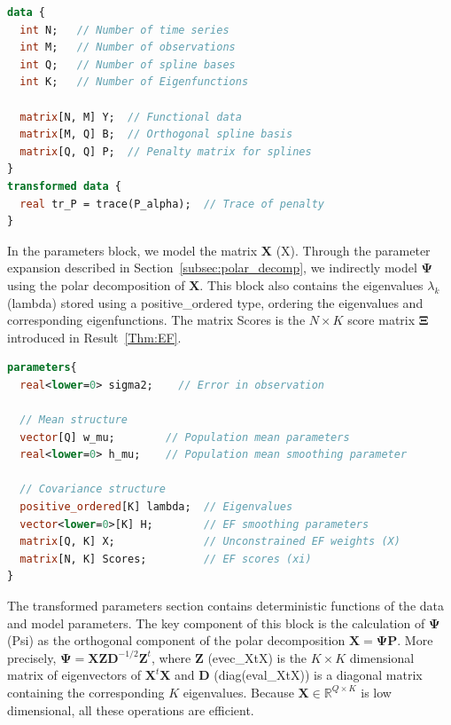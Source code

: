 \documentclass[12pt]{article}
\begin{document}
\singlespacing
\begin{lstlisting}[language=Stan]
data {
  int N;   // Number of time series
  int M;   // Number of observations
  int Q;   // Number of spline bases
  int K;   // Number of Eigenfunctions
  
  matrix[N, M] Y;  // Functional data
  matrix[M, Q] B;  // Orthogonal spline basis
  matrix[Q, Q] P;  // Penalty matrix for splines
}
transformed data {
  real tr_P = trace(P_alpha);  // Trace of penalty
}
\end{lstlisting}
\doublespacing

In the {\ttfamily parameters} block, we model the matrix $\mathbf{X}$ ({\ttfamily X}). Through the parameter expansion described in Section~\ref{subsec:polar_decomp}, we indirectly model $\mathbf{\Psi}$ using the polar decomposition of $\mathbf{X}$. This block also contains the eigenvalues $\lambda_k$ ({\ttfamily lambda}) stored using a {\ttfamily positive\_ordered} type, ordering the eigenvalues and corresponding eigenfunctions. The matrix {\ttfamily Scores} is the $N \times K$ score matrix $\mathbf{\Xi}$ introduced in Result~\ref{Thm:EF}.

\singlespacing
\begin{lstlisting}[language=Stan]
parameters{
  real<lower=0> sigma2;    // Error in observation
  
  // Mean structure
  vector[Q] w_mu;        // Population mean parameters
  real<lower=0> h_mu;    // Population mean smoothing parameter

  // Covariance structure
  positive_ordered[K] lambda;  // Eigenvalues
  vector<lower=0>[K] H;        // EF smoothing parameters
  matrix[Q, K] X;              // Unconstrained EF weights (X)
  matrix[N, K] Scores;         // EF scores (xi)
}
\end{lstlisting}
\doublespacing

The {\ttfamily transformed parameters} section contains deterministic functions of the data and model parameters. The key component of this block is the calculation of $\mathbf{\Psi}$ ({\ttfamily Psi}) as the orthogonal component of the polar decomposition $\mathbf{X}=\mathbf{\Psi}\mathbf{P}$. More precisely, $\mathbf{\Psi}=\mathbf{XZD}^{-1/2}\mathbf{Z}^t$, where $\mathbf{Z}$ ({\ttfamily evec\_XtX}) is the $K\times K$ dimensional matrix of eigenvectors of $\mathbf{X}^t\mathbf{X}$ and $\mathbf{D}$ ({\ttfamily diag(eval\_XtX)}) is a diagonal matrix containing the corresponding $K$ eigenvalues. Because $\mathbf{X} \in \mathbb{R}^{Q \times K}$ is low dimensional, all these operations are efficient.
\end{document}
